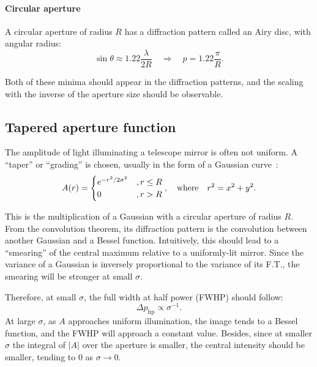 \documentclass{article}
\newcommand{\R}[1]{\mathrm{#1}}
\begin{document}
\paragraph{Circular aperture} A circular aperture of radius $R$ has a diffraction pattern called an Airy disc, with angular radius:
\begin{equation}\label{eqn:test_circ}
    \sin{\theta} \approx 1.22 \frac{\lambda}{2R} \quad \Rightarrow \quad p = 1.22 \frac{\pi}{R}.
\end{equation}

Both of these minima should appear in the diffraction patterns, and the scaling with the inverse of the aperture size should be observable.

\subsection{Tapered aperture function}\label{sec:analysis:taper}
The amplitude of light illuminating a telescope mirror is often not uniform. A ``taper'' or ``grading'' is chosen, usually in the form of a Gaussian curve~\cite[Section~6.4]{RadioAstro}:
\begin{equation}
    A(r) = \begin{cases}
        e ^ {-r^2 / {2 \sigma^2}} &, r \leq R\\
        0 &, r > R
    \end{cases}, \qq{where} r^2 = x^2 + y^2.
\end{equation}

This is the multiplication of a Gaussian with a circular aperture of radius $R$. From the convolution theorem, its diffraction pattern is the convolution between another Gaussian and a Bessel function. Intuitively, this should lead to a ``smearing'' of the central maximum relative to a uniformly-lit mirror. Since the variance of a Gaussian is inversely proportional to the variance of its F.T., the smearing will be stronger at small $\sigma$.

Therefore, at small $\sigma$, the full width at half power (FWHP) should follow:
\begin{equation}
    \Delta p_{\R{hp}} \propto \sigma^{-1}.
\end{equation}
At large $\sigma$, as $A$ approaches uniform illumination, the image tends to a Bessel function, and the FWHP will approach a constant value. Besides, since at smaller $\sigma$ the integral of $|A|$ over the aperture is smaller, the central intensity should be smaller, tending to 0 as $\sigma \rightarrow 0$.
\end{document}
